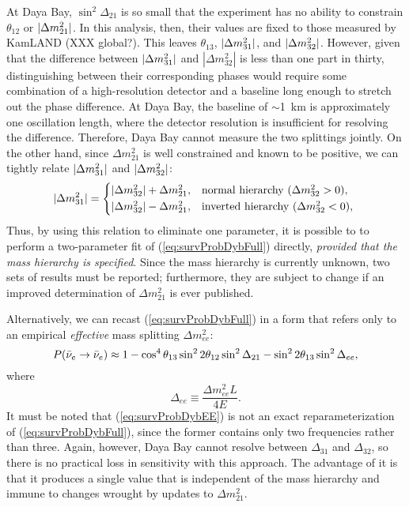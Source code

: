\documentclass[../thesis.tex]{subfiles}
\begin{document}
At Daya Bay, \(\sin^2 \Delta_{21}\) is so small that the experiment has no
ability to constrain $\theta_{12}$ or \(\lvert \Delta m^2_{21}\rvert\). In this
analysis, then, their values are fixed to those measured by KamLAND (XXX
global?). This leaves $\theta_{13}$, \(\lvert \Delta m^2_{31}\rvert\), and
\(\lvert \Delta m^2_{32}\rvert\). However, given that the difference between
\(\lvert \Delta m^2_{31}\rvert\) and \(|\Delta m^2_{32}|\) is less than one part in
thirty, distinguishing between their corresponding phases would require some
combination of a high-resolution detector and a baseline long enough to stretch
out the phase difference. At Daya Bay, the baseline of $\sim$1~km is
approximately one oscillation length, where the detector resolution is
insufficient for resolving the difference. Therefore, Daya Bay cannot measure
the two splittings jointly. On the other hand, since \(\Delta m^2_{21}\) is well
constrained and known to be positive, we can tightly relate \(\lvert \Delta
  m^2_{31}\rvert\) and \(\lvert \Delta m^2_{32}\rvert\):
\begin{equation*}
  \label{eq:hierarchy}
  \abs{\Delta m^2_{31}} =
  \begin{cases*}
    \abs{\Delta m^2_{32}} + \Delta m^2_{21}, & normal hierarchy ($\Delta m^2_{32} > 0$), \\
    \abs{\Delta m^2_{32}} - \Delta m^2_{21}, & inverted hierarchy ($\Delta m^2_{32} < 0$), \\
  \end{cases*}
\end{equation*}
Thus, by using this relation to eliminate one parameter, it is possible to to
perform a two-parameter fit of (\ref{eq:survProbDybFull}) directly,
\emph{provided that the mass hierarchy is specified}. Since the mass hierarchy
is currently unknown, two sets of results must be reported; furthermore, they
are subject to change if an improved determination of \(\Delta m^2_{21}\) is
ever published.

Alternatively, we can recast (\ref{eq:survProbDybFull}) in a form that refers
only to an empirical \emph{effective} mass splitting \(\Delta m^2_{ee}\):
\begin{equation}
  \label{eq:survProbDybEE}
  P(\bar\nu_e \rightarrow \bar\nu_e) \approx 1 - \cos^4\theta_{13}\sin^2 2\theta_{12} \sin^2 \Delta_{21}
  - \sin^2 2\theta_{13}\sin^2\Delta_{ee},
\end{equation}
where
\begin{equation*}
  \Delta_{ee} \equiv \frac{\Delta m^2_{ee}L}{4E}. 
\end{equation*}
It must be noted that (\ref{eq:survProbDybEE}) is not an exact
reparameterization of (\ref{eq:survProbDybFull}), since the former contains only
two frequencies rather than three. Again, however, Daya Bay cannot resolve
between $\Delta_{31}$ and $\Delta_{32}$, so there is no practical loss in
sensitivity with this approach. The advantage of it is that it produces a single
value that is independent of the mass hierarchy and immune to changes wrought by
updates to \(\Delta m^2_{21}\).
\end{document}
